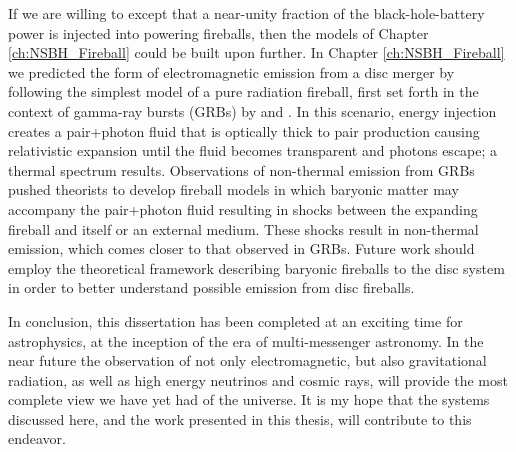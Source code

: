 %
%

If we are willing to except that a near-unity fraction of the black-hole-battery 
power is injected into powering fireballs, then the models of Chapter
\ref{ch:NSBH_Fireball} could be built upon further.  In Chapter
\ref{ch:NSBH_Fireball} we predicted the form of electromagnetic emission from
a disc merger by following the simplest model of a pure radiation fireball,
first set forth in the context of gamma-ray bursts (GRBs) by \cite{Pacz:1986GRB} and
\cite{GoodmanGRB:1986}. In this scenario, energy injection creates a
pair+photon fluid that is optically thick to pair production causing
relativistic expansion until the fluid becomes transparent and photons escape;
a thermal spectrum results. Observations of non-thermal emission from GRBs
pushed theorists to develop fireball models in which baryonic
matter may accompany the pair+photon fluid resulting in shocks between the
expanding fireball and itself or an external medium. These shocks result in
non-thermal emission, which comes closer to that observed in GRBs. Future work
should employ the theoretical framework describing baryonic fireballs
\citep{Piran_FBRev:1999} to the disc system in order to better understand
possible emission from disc fireballs.


In conclusion, this dissertation has been completed at an exciting time for
astrophysics, at the inception of the era of multi-messenger astronomy. In the
near future the observation of not only electromagnetic, but also
gravitational radiation, as well as high energy neutrinos and cosmic rays,
will provide the most complete view we have yet had of the universe. It is my
hope that the systems discussed here, and the work presented in this thesis,
will contribute to this endeavor.

